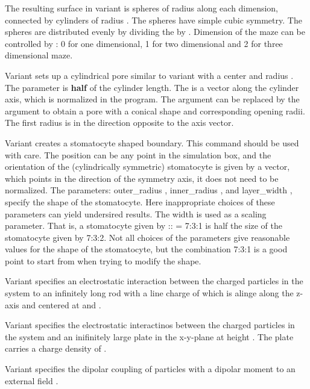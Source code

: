 The resulting surface in variant  is 
spheres of radius  along each dimension, connected by
cylinders of radius . The spheres have simple cubic
symmetry. The spheres are distributed evenly by dividing the
 by .  Dimension of the maze can be controlled by
: 0 for one dimensional, 1 for two dimensional and 2 for three
dimensional maze.

Variant  sets up a cylindrical pore similar to variant
 with a center    and radius
. The  parameter is \textbf{half} of the cylinder
length. The  is a vector along the cylinder axis, which is
normalized in the program. The argument  
can be replaced by the argument 
to obtain a pore with a conical shape and corresponding opening radii.
The first radius is in the direction opposite to the axis vector.

Variant  creates a stomatocyte shaped boundary. This command
should be used with care. The position can be any point in the simulation
box, and the orientation of the (cylindrically symmetric) stomatocyte is
given by a vector, which points in the direction of the symmetry axis, it
does not need to be normalized. The parameters: outer_radius ,
inner_radius , and layer_width , specify the shape of the
stomatocyte. Here inappropriate choices of these parameters can yield 
undersired results. The width is used as a scaling parameter. That is,
a stomatocyte given by :: = 7:3:1 is half the size
of the stomatocyte given by 7:3:2. Not all choices of the parameters give
reasonable values for the shape of the stomatocyte, but the combination
7:3:1 is a good point to start from when trying to modify the shape. 

Variant  specifies an electrostatic interaction between the
charged particles in the system to an infinitely long rod with a line
charge of  which is alinge along the z-axis and centered
at  and .

Variant  specifies the electrostatic interactinos between
the charged particles in the system and an inifinitely large plate in
the x-y-plane at height . The plate carries a charge density of
.
  
Variant  specifies the dipolar coupling of particles with a
dipolar moment to an external field   .

